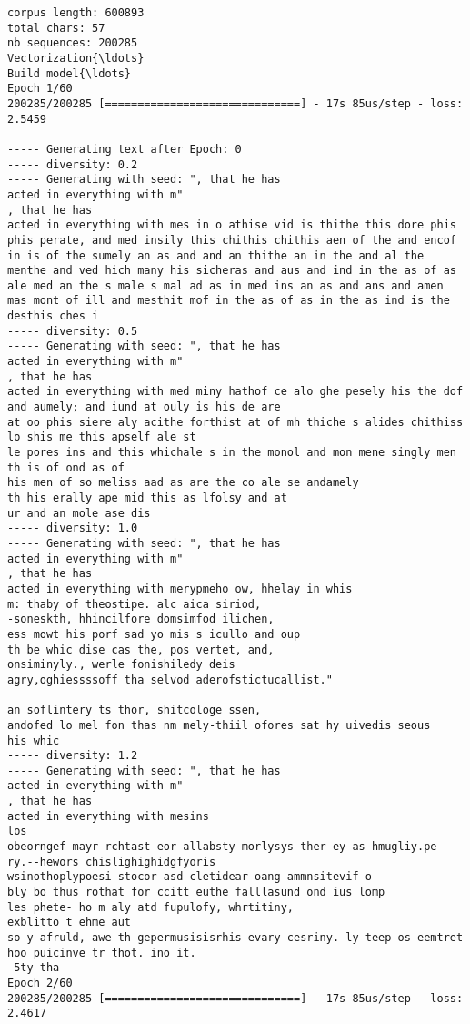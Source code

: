 \documentclass[11pt]{article}
\begin{document}
    \begin{Verbatim}[commandchars=\\\{\}]
corpus length: 600893
total chars: 57
nb sequences: 200285
Vectorization{\ldots}
Build model{\ldots}
Epoch 1/60
200285/200285 [==============================] - 17s 85us/step - loss: 2.5459

----- Generating text after Epoch: 0
----- diversity: 0.2
----- Generating with seed: ", that he has
acted in everything with m"
, that he has
acted in everything with mes in o athise vid is thithe this dore phis phis perate, and med insily this chithis chithis aen of the and encof in is of the sumely an as and and an thithe an in the and al the menthe and ved hich many his sicheras and aus and ind in the as of as ale med an the s male s mal ad as in med ins an as and ans and amen mas mont of ill and mesthit mof in the as of as in the as ind is the
desthis ches i
----- diversity: 0.5
----- Generating with seed: ", that he has
acted in everything with m"
, that he has
acted in everything with med miny hathof ce alo ghe pesely his the dof and aumely; and iund at ouly is his de are
at oo phis siere aly acithe forthist at of mh thiche s alides chithiss lo shis me this apself ale st
le pores ins and this whichale s in the monol and mon mene singly men th is of ond as of
his men of so meliss aad as are the co ale se andamely
th his erally ape mid this as lfolsy and at
ur and an mole ase dis 
----- diversity: 1.0
----- Generating with seed: ", that he has
acted in everything with m"
, that he has
acted in everything with merypmeho ow, hhelay in whis
m: thaby of theostipe. alc aica siriod,
-soneskth, hhincilfore domsimfod ilichen,
ess mowt his porf sad yo mis s icullo and oup
th be whic dise cas the, pos vertet, and,
onsiminyly., werle fonishiledy deis
agry,oghiessssoff tha selvod aderofstictucallist."

an soflintery ts thor, shitcologe ssen,
andofed lo mel fon thas nm mely-thiil ofores sat hy uivedis seous
his whic
----- diversity: 1.2
----- Generating with seed: ", that he has
acted in everything with m"
, that he has
acted in everything with mesins
los
obeorngef mayr rchtast eor allabsty-morlysys ther-ey as hmugliy.pe
ry.--hewors chislighighidgfyoris
wsinothoplypoesi stocor asd cletidear oang ammnsitevif o
bly bo thus rothat for ccitt euthe falllasund ond ius lomp
les phete- ho m aly atd fupulofy, whrtitiny,
exblitto t ehme aut
so y afruld, awe th gepermusisisrhis evary cesriny. ly teep os eemtret hoo puicinve tr thot. ino it.
 5ty tha
Epoch 2/60
200285/200285 [==============================] - 17s 85us/step - loss: 2.4617


\end{Verbatim}
\end{document}
